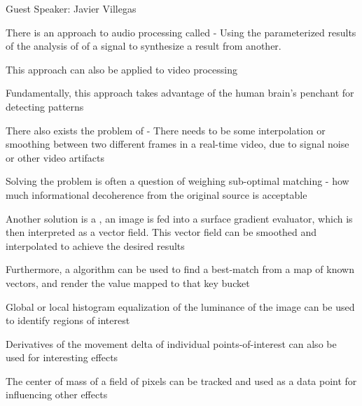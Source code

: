 \documentclass[11pt]{article}
\begin{document}
\maketitle

\begin{topic}{Guest Speaker: Javier Villegas}
	\item There is an approach to audio processing called  - Using the parameterized results of the analysis of of a signal to synthesize a result from another.
	\item This approach can also be applied to video processing
	\item Fundamentally, this approach takes advantage of the human brain's penchant for detecting patterns
	\item There also exists the problem of  - There needs to be some interpolation or smoothing between two different frames in a real-time video, due to signal noise or other video artifacts
	\item Solving the  problem is often a question of weighing sub-optimal matching - how much informational decoherence from the original source is acceptable
	\item Another solution is a , an image is fed into a surface gradient evaluator, which is then interpreted as a vector field. This vector field can be smoothed and interpolated to achieve the desired results
	\item Furthermore, a  algorithm can be used to find a best-match from a map of known vectors, and render the value mapped to that key bucket
	\item Global or local histogram equalization of the luminance of the image can be used to identify regions of interest
	\item Derivatives of the movement delta of individual points-of-interest can also be used for interesting effects
	\item The center of mass of a field of pixels can be tracked and used as a data point for influencing other effects
\end{topic}
\end{document}
